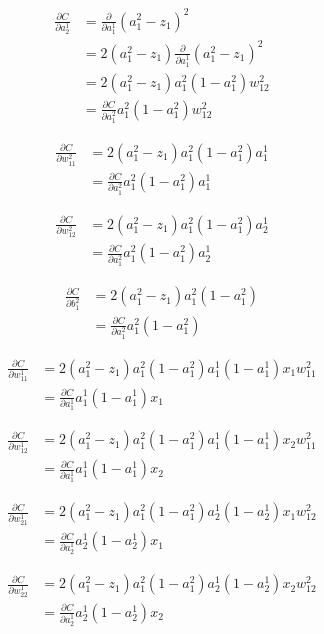 \documentclass{article}
\begin{document}
\begin{align*}
\frac{\partial C}{\partial a^1_2} &= \frac{\partial}{\partial a^1_1} (a^2_1 - z_1)^2\\
&= 2 (a^2_1 - z_1) \frac{\partial}{\partial a^1_1} (a^2_1 - z_1)^2\\
&= 2 (a^2_1 - z_1) a^2_1 (1 - a^2_1) w^2_{12}\\
&= \frac{\partial C}{\partial a^2_1} a^2_1 (1 - a^2_1) w^2_{12}
\end{align*}

\begin{align*}
\frac{\partial C}{\partial w^2_{11}} &= 2 (a^2_1 - z_1) a^2_1(1 - a^2_1)a^1_1\\
&= \frac{\partial C}{\partial a^2_1} a^2_1(1 - a^2_1)a^1_1
\end{align*}

\begin{align*}
\frac{\partial C}{\partial w^2_{12}} &= 2 (a^2_1 - z_1) a^2_1(1 - a^2_1)a^1_2\\
&= \frac{\partial C}{\partial a^2_1} a^2_1(1 - a^2_1)a^1_2
\end{align*}

\begin{align*}
\frac{\partial C}{\partial b^2_{1}} &= 2 (a^2_1 - z_1) a^2_1(1 - a^2_1)\\
&= \frac{\partial C}{\partial a^2_1} a^2_1(1 - a^2_1)
\end{align*}

\begin{align*}
\frac{\partial C}{\partial w^1_{11}} &= 2 (a^2_1 - z_1) a^2_1(1 - a^2_1)a^1_1(1 - a^1_1)x_1w^2_{11}\\
&= \frac{\partial C}{\partial a^1_1} a^1_1 (1 - a^1_1) x_1
\end{align*}

\begin{align*}
\frac{\partial C}{\partial w^1_{12}} &= 2 (a^2_1 - z_1) a^2_1(1 - a^2_1)a^1_1(1 - a^1_1)x_2w^2_{11}\\
&= \frac{\partial C}{\partial a^1_1} a^1_1 (1 - a^1_1) x_2
\end{align*}

\begin{align*}
\frac{\partial C}{\partial w^1_{21}} &= 2 (a^2_1 - z_1) a^2_1(1 - a^2_1)a^1_2(1 - a^1_2)x_1w^2_{12}\\
&= \frac{\partial C}{\partial a^1_2} a^1_2 (1 - a^1_2) x_1
\end{align*}

\begin{align*}
\frac{\partial C}{\partial w^1_{22}} &= 2 (a^2_1 - z_1) a^2_1(1 - a^2_1)a^1_2(1 - a^1_2)x_2w^2_{12}\\
&= \frac{\partial C}{\partial a^1_2} a^1_2 (1 - a^1_2) x_2
\end{align*}
\end{document}
